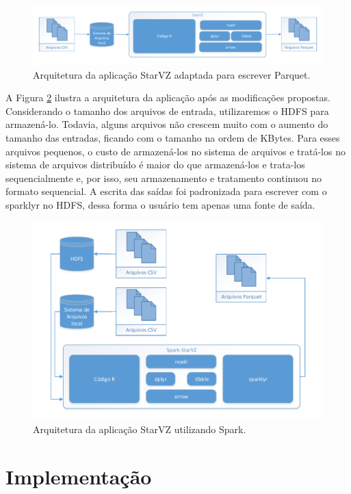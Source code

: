 \begin{figure}[ht]
 \centerline{\includegraphics[width=1\textwidth]{./img/starvz-arch-arrow.pdf}}
 \caption{Arquitetura da aplicação StarVZ adaptada para escrever Parquet.}
 \label{fig:starvz-app-arrow}
\end{figure}

A Figura \ref{fig:starvz-app-spark} ilustra a arquitetura da aplicação após as modificações propostas. Considerando o tamanho dos arquivos de entrada, utilizaremos o HDFS para armazená-lo. Todavia, alguns arquivos não crescem muito com o aumento do tamanho das entradas, ficando com o tamanho na ordem de KBytes. Para esses arquivos pequenos, o custo de armazená-los no sistema de arquivos e tratá-los no 
sistema de arquivos distribuído é maior do que armazená-los e trata-los sequencialmente e, por isso, seu armazenamento e tratamento continuou no formato sequencial. A escrita das saídas foi padronizada para escrever com o sparklyr no HDFS, dessa forma o usuário 
tem apenas uma fonte de saída.

\begin{figure}[ht]
 \centerline{\includegraphics[width=1\textwidth]{./img/starvz-arch-spark.pdf}}
 \caption{Arquitetura da aplicação StarVZ utilizando Spark.}
 \label{fig:starvz-app-spark}
\end{figure}

\section{Implementação} \label{sect:implement}


